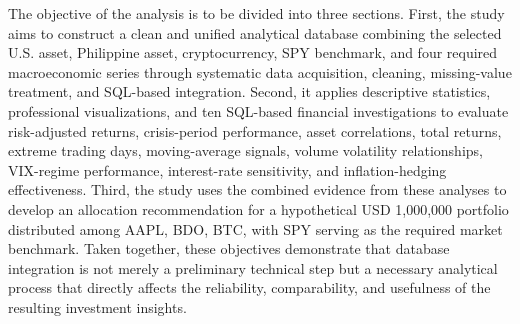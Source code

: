 The objective of the analysis is to be divided into three sections. First, the study aims to construct a clean and unified analytical database combining the selected U.S. asset, Philippine asset, cryptocurrency, SPY benchmark, and four required macroeconomic series through systematic data acquisition, cleaning, missing-value treatment, and SQL-based integration. Second, it applies descriptive statistics, professional visualizations, and ten SQL-based financial investigations to evaluate risk-adjusted returns, crisis-period performance, asset correlations, total returns, extreme trading days, moving-average signals, volume volatility relationships, VIX-regime performance, interest-rate sensitivity, and inflation-hedging effectiveness. Third, the study uses the combined evidence from these analyses to develop an allocation recommendation for a hypothetical USD 1,000,000 portfolio distributed among AAPL, BDO, BTC, with SPY serving as the required market benchmark. Taken together, these objectives demonstrate that database integration is not merely a preliminary technical step but a necessary analytical process that directly affects the reliability, comparability, and usefulness of the resulting investment insights.
